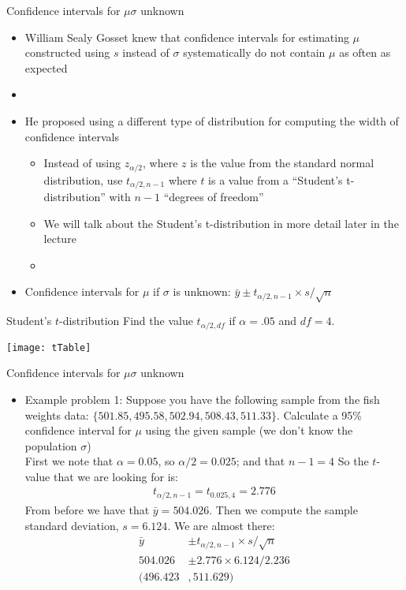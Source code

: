 \documentclass[xcolor=dvipsnames]{beamer}
\begin{document}
\begin{frame}{Confidence intervals for $\mu$}{$\sigma$ unknown}
	\begin{itemize}
		\item William Sealy Gosset knew that confidence intervals for estimating $\mu$ constructed using $s$ instead of $\sigma$ systematically do not contain $\mu$ as often as expected  \pause
		\item[]
		\item He proposed using a different type of distribution for computing the width of confidence intervals  \pause
		\begin{itemize}
			\item Instead of using $z_{\alpha / 2}$, where $z$ is the value from the standard normal distribution, use $t_{\alpha / 2, n - 1}$ where $t$ is a value from a ``Student's t-distribution'' with $n-1$ ``degrees of freedom''  \pause
			\item We will talk about the Student's t-distribution in more detail later in the lecture
				\item[]  \pause
		\end{itemize}
			\item Confidence intervals for $\mu$ if $\sigma$ is unknown: $\bar{y} \pm t_{\alpha / 2, n - 1} \times s / \sqrt{n}$
	\end{itemize}
\end{frame}

\begin{frame}{Student's $t$-distribution}
	Find the value $t_{\alpha / 2, df}$ if $\alpha = .05$ and $df = 4$. 
	\begin{center}
		\texttt{[image: tTable]}
	\end{center}
\end{frame}

\begin{frame}{Confidence intervals for $\mu$}{$\sigma$ unknown}
	\begin{itemize}
		\item Example problem 1: Suppose you have the following sample from the fish weights data: $\{501.85, 495.58, 502.94, 508.43, 511.33\}$. Calculate a 95\% confidence interval for $\mu$ using the given sample (we don't know the population $\sigma$)  \pause \\
		\vspace{10 pt}
		First we note that $\alpha = 0.05$, so $\alpha / 2 = 0.025$; and that $n - 1 = 4$  \pause So the $t$-value that we are looking for is:
		\begin{gather*}
			t_{\alpha / 2, n - 1} = t_{0.025, 4} = 2.776
		\end{gather*}  \pause
		From before we have that $\bar{y}=504.026$. Then we compute the sample standard deviation, $s = 6.124$. We are almost there:  \pause
		\begin{align*}
			\bar{y} &\pm t_{\alpha / 2, n - 1} \times s / \sqrt{n} \\
			504.026 &\pm 2.776 \times 6.124 / 2.236 \\
			(496.423&, 511.629)
		\end{align*}
	\end{itemize}
\end{frame}
\end{document}
